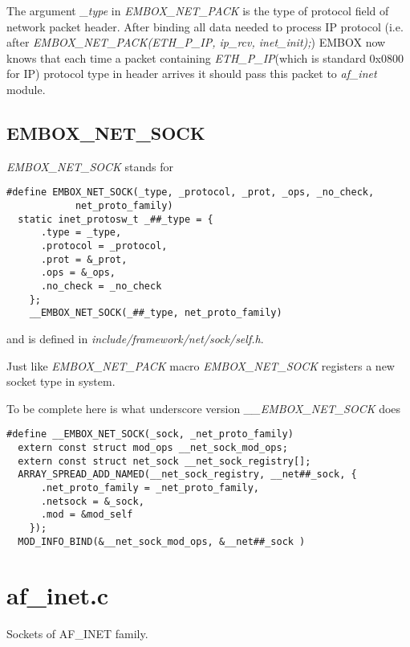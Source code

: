 \documentclass[12pt,a4paper]{article}
\begin{document}
 The argument {\it \_type } in {\it EMBOX\_NET\_PACK} is the type of protocol field of
network packet header. After binding all data needed to process IP protocol
(i.e. after {\it EMBOX\_NET\_PACK(ETH\_P\_IP, ip\_rcv, inet\_init);}) EMBOX now
knows that each time a packet containing {\it ETH\_P\_IP}(which is standard
0x0800 for IP) protocol type in header arrives it should pass this packet to
{\it af\_inet} module.


\subsection{EMBOX\_NET\_SOCK}
\label{sec:embox_net_sock}

{\it EMBOX\_NET\_SOCK} stands for
\begin{verbatim}
#define EMBOX_NET_SOCK(_type, _protocol, _prot, _ops, _no_check,   
            net_proto_family)     
  static inet_protosw_t _##_type = {         
      .type = _type,          
      .protocol = _protocol,        
      .prot = &_prot,                      
      .ops = &_ops,           
      .no_check = _no_check        
    };              
    __EMBOX_NET_SOCK(_##_type, net_proto_family)
\end{verbatim}
and is defined in {\it include/framework/net/sock/self.h}.

Just like {\it EMBOX\_NET\_PACK} macro {\it EMBOX\_NET\_SOCK} registers a new
socket type in system.

To be complete here is what underscore version {\it \_\_EMBOX\_NET\_SOCK} does
\begin{verbatim}
#define __EMBOX_NET_SOCK(_sock, _net_proto_family) 
  extern const struct mod_ops __net_sock_mod_ops;             
  extern const struct net_sock __net_sock_registry[];         
  ARRAY_SPREAD_ADD_NAMED(__net_sock_registry, __net##_sock, { 
      .net_proto_family = _net_proto_family,      
      .netsock = &_sock,                          
      .mod = &mod_self                            
    });                                                 
  MOD_INFO_BIND(&__net_sock_mod_ops, &__net##_sock )
\end{verbatim}

\newpage

\section{af\_inet.c}
\label{sec:af_inet_c}
Sockets of AF\_INET family.
\end{document}

